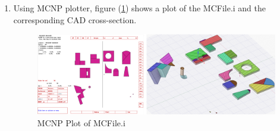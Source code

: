 \documentclass[12pt, a4paper, titlepage]{article}
\begin{document}
\begin{enumerate}
  \item Using MCNP plotter, figure (\ref{fig:MCFile.i plot}) shows a plot of the MCFile.i and the corresponding CAD cross-section.
  \begin{figure}[h!]
  	\centering
  	\includegraphics[scale=0.32]{figures/ConvertedSolids.png}
  	\caption{MCNP Plot of MCFile.i}
  	\label{fig:MCFile.i plot}
  \end{figure}
\end{enumerate}

\end{document}
